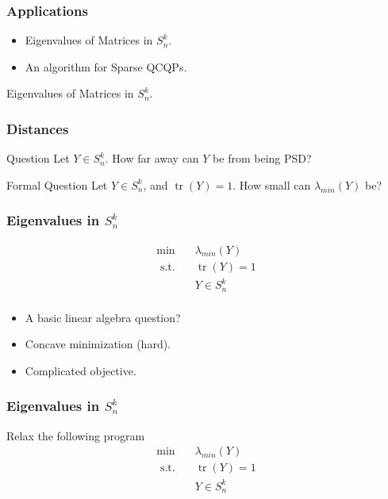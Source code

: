 \documentclass{beamer}
\DeclareMathOperator{\tr}{tr}
\newcommand{\st}{{\text{ s.t. }}}
\begin{document}
\begin{frame}
    \frametitle{Applications}
    \begin{itemize}
        \item Eigenvalues of Matrices in $S^k_n$.
        \item An algorithm for Sparse QCQPs.
    \end{itemize}
\end{frame}
\begin{frame}
    \centering
    \huge
    {\color{gray}Eigenvalues of Matrices in $S^k_n$.}
\end{frame}
\begin{frame}
    \frametitle{Distances}
    \begin{block}{Question}
        Let $Y \in S^k_n$. How far away can $Y$ be from being PSD?
    \end{block}
    \pause
    \begin{block}{Formal Question}
        Let $Y \in S^k_n$, and $\tr(Y)=1$. How small can $\lambda_{min}(Y)$ be?
    \end{block}
\end{frame}
\begin{frame}
    \frametitle{Eigenvalues in $S^k_n$}
    \begin{equation*}
        \begin{aligned}
            \min\quad & \lambda_{min}(Y)\\
            \st & \tr(Y) = 1\\
                & Y \in S^k_n\\
        \end{aligned}
    \end{equation*}
    \pause
    \begin{itemize}
        \item A basic linear algebra question?
        \pause
        \item Concave minimization (hard).
        \pause
        \item Complicated objective.
    \end{itemize}
\end{frame}
\begin{frame}
    \frametitle{Eigenvalues in $S^k_n$}
    Relax the following program
    \begin{equation*}
        \begin{aligned}
            \min\quad & \lambda_{min}(Y)\\
            \st & \tr(Y) = 1\\
                & Y \in S^k_n\\
        \end{aligned}
    \end{equation*}
\end{frame}
\end{document}

